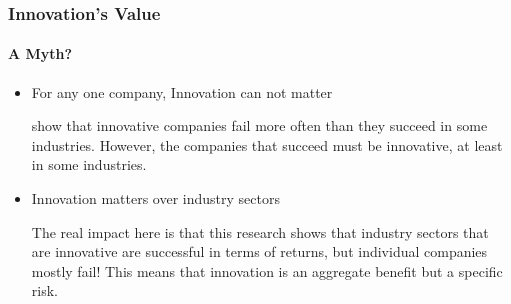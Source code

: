 \begin{frame}
  \frametitle{Innovation's Value}
  \framesubtitle{A Myth? }
  \begin{itemize}
    \item<1-> For any one company, Innovation can not matter

           {\scriptsize{\textcite{drakemanRiskDeRiskingInnovation2020} show that innovative companies fail more often than they succeed in some industries. However, the companies that succeed must be innovative, at least in some industries.}}

    \item<2-> Innovation matters over industry sectors

           {\scriptsize{The real impact here is that this research shows that industry sectors that are innovative are successful in terms of returns, but individual companies mostly fail! This means that innovation is an aggregate benefit but a specific risk.}}

  \end{itemize}
\end{frame}
